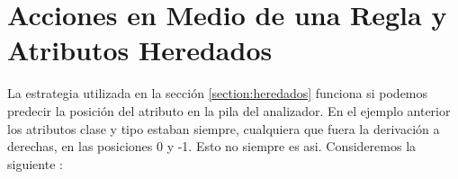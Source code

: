 %
%
%
%
%
%

\section{Acciones en Medio de una Regla y Atributos Heredados}
\label{section:mediaregla}
La estrategia utilizada en la sección \ref{section:heredados} funciona
si podemos predecir la posición del atributo en la pila del analizador.
En el ejemplo anterior los atributos clase y tipo estaban siempre,
cualquiera que fuera la derivación a derechas, 
en las posiciones 0 y -1. Esto no siempre es asi. Consideremos
la siguiente :

